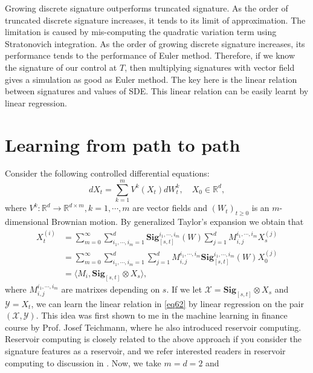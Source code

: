 \documentclass[12pt]{report}
\theoremstyle{definition}
\theoremstyle{remark}
\newcommand{\R}{\mathbb{R}}
\begin{document}
Growing discrete signature outperforms truncated signature. As the order of truncated discrete signature increases, it tends to its limit of approximation. The limitation is caused by mis-computing the quadratic variation term using Stratonovich integration. As the order of growing discrete signature increases, its performance tends to the performance of Euler method. Therefore, if we know the signature of our control at $T$, then multiplying signatures with vector field gives a simulation as good as Euler method. The key here is the linear relation between signatures and values of SDE. This linear relation can be easily learnt by linear regression.

\section{Learning from path to path}
Consider the following controlled differential equations:
\begin{equation}
  dX_{t} = \sum_{k=1}^{m}V^{k}(X_{t})dW^{k}_{t},\quad X_{0}\in\R^{d},
\end{equation}
where $V^{k}\colon \R^{d} \to \R^{d\times m}, k = 1,\cdots, m$ are vector fields and $(W_{t})_{t\geq 0}$ is an $m$-dimensional Brownian motion. By generalized Taylor's expansion we obtain that 
\begin{equation}\label{eq62}
    \begin{split}
        X^{(i)}_{t} &= \sum_{m=0}^{\infty}\sum_{i_{1},\cdots,i_{m} = 1}^{d}\mathbf{Sig}_{[s,t]}^{i_{1},\cdots,i_{m}}(W)\sum_{j=1}^{d}M^{i_{1},\cdots,i_{m}}_{i,j}X^{(j)}_{s}\\
        &= \sum_{m=0}^{\infty}\sum_{i_{1},\cdots,i_{m} = 1}^{d}\sum_{j=1}^{d}M^{i_{1},\cdots,i_{m}}_{i,j} \mathbf{Sig}_{[s,t]}^{i_{1},\cdots,i_{m}}(W) X^{(j)}_{0}\\
        &= \langle M_{i} ,  \mathbf{Sig}_{[s,t]} \otimes X_{s} \rangle,
    \end{split}
\end{equation}
where $M^{i_{1},\cdots,i_{m}}_{i,j}$ are matrixes depending on $s$. If we let $\mathcal{X} = \mathbf{Sig}_{[s,t]} \otimes X_{s}$ and $\mathcal{Y} = X_{t}$, we can learn the linear relation in \eqref{eq62} by linear regression on the pair $(\mathcal{X},\mathcal{Y})$. This idea was first shown to me in the machine learning in finance course by Prof. Josef Teichmann, where he also introduced reservoir computing. Reservoir computing is closely related to the above approach if you consider the signature features as a reservoir, and we refer interested readers in reservoir computing to discussion in \cite{cuchiero2020discrete}. Now, we take $m = d = 2$ and 
\end{document}
